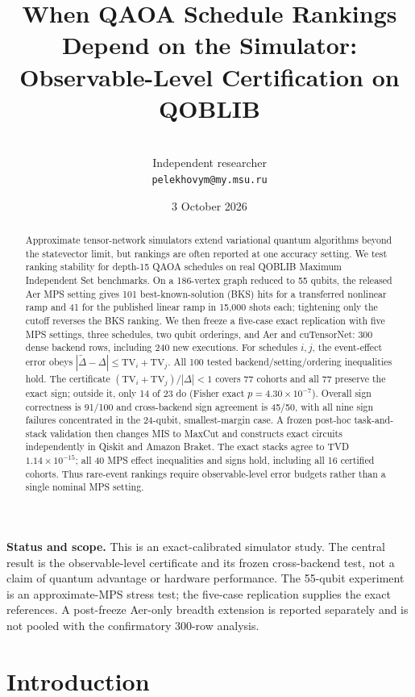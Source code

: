 \documentclass[10pt,twocolumn]{article}
\title{When QAOA Schedule Rankings Depend on the Simulator:\\
Observable-Level Certification on QOBLIB}
\author{\paperauthor\\\small Independent researcher\\\small \texttt{pelekhovym@my.msu.ru}}
\date{3 October 2026}
\begin{document}
\maketitle

\begin{abstract}
Approximate tensor-network simulators extend variational quantum algorithms
beyond the statevector limit, but rankings are often reported at one accuracy
setting. We test ranking stability for depth-15 QAOA schedules on real QOBLIB
Maximum Independent Set benchmarks. On a 186-vertex graph reduced to 55 qubits,
the released Aer MPS setting gives 101 best-known-solution (BKS) hits for a
transferred nonlinear ramp and 41 for the published linear ramp in 15,000 shots
each; tightening only the cutoff reverses the BKS ranking. We then freeze a
five-case exact replication with five MPS settings, three schedules, two qubit
orderings, and Aer and cuTensorNet: 300 dense backend rows, including 240 new
executions. For schedules $i,j$, the event-effect error obeys
$|\widetilde\Delta-\Delta|\leq\mathrm{TV}_i+\mathrm{TV}_j$. All 100 tested
backend/setting/ordering inequalities hold. The certificate
$(\mathrm{TV}_i+\mathrm{TV}_j)/|\Delta|<1$ covers 77 cohorts and all 77 preserve
the exact sign; outside it, only 14 of 23 do (Fisher exact
$p=4.30\times10^{-7}$). Overall sign correctness is 91/100 and cross-backend
sign agreement is 45/50, with all nine sign failures concentrated in the
24-qubit, smallest-margin case. A frozen post-hoc task-and-stack validation
then changes MIS to MaxCut and constructs exact circuits independently in
Qiskit and Amazon Braket. The exact stacks agree to TVD $1.14\times10^{-15}$;
all 40 MPS effect inequalities and signs hold, including all 16 certified
cohorts. Thus rare-event rankings require
observable-level error budgets rather than a single nominal MPS setting.
\end{abstract}

\noindent\textbf{Status and scope.}
This is an exact-calibrated simulator study.  The central result is the
observable-level certificate and its frozen cross-backend test, not a claim
of quantum advantage or hardware performance.  The 55-qubit experiment is an
approximate-MPS stress test; the five-case replication supplies the exact
references.  A post-freeze Aer-only breadth extension is reported separately
and is not pooled with the confirmatory 300-row analysis.

\section{Introduction}
\end{document}

